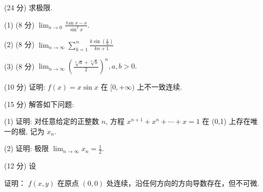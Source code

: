 \par{}
(24 分) 求极限.\par
(1) (8 分)  $\lim_{x\to0}\frac{\tan x-x}{\sin^{3}x}.$\par
(2) (8 分) $\lim_{n\to \infty}\sum_{k = 1}^{n}\frac{k\sin\left(\frac{k}{n}\right)}{kn + 1}$\par
(3) (8 分) $\lim_{n\to \infty}\left(\frac{\sqrt[n]{a} + \sqrt[n]{b}}{2}\right)^n, a, b > 0.$\par
\par{}
(10 分) 证明: $f(x) = x \sin x$ 在 $[0, +\infty)$ 上不一致连续.\par
\par{}
(15 分) 解答如下问题:\par
(1) 证明: 对任意给定的正整数 $n$, 方程 $x^{n+1} + x^n + \cdots + x = 1$ 在 (0,1) 上存在唯一的根, 记为 $x_n$.\par
(2) 证明: 极限 $\lim_{n\to \infty}x_n = \frac{1}{2}$.\par
\par{}
\par{}
(12 分) 设\par
\nopagebreak[4]
证明： $f(x,y)$ 在原点 $(0,0)$ 处连续，沿任何方向的方向导数存在，但不可微.\par
\par{}
\par{}
